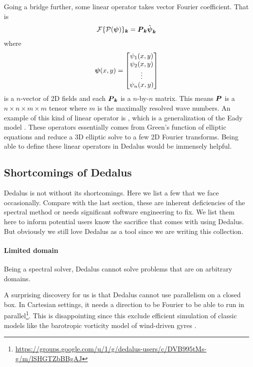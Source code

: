Going a bridge further, some linear operator takes vector Fourier coefficient. That is
\begin{align}
    \mathcal{F}\{\mathcal{P}(\boldsymbol{\psi})\}_{\boldsymbol{k}} = \boldsymbol{P}_{\boldsymbol{k}}\hat{\boldsymbol{\psi}}_{\boldsymbol{k}}
\end{align}
where 
\begin{align}
    \boldsymbol{\psi}(x,y) = \begin{bmatrix}
        \psi_1(x,y)\\
        \psi_2(x,y)\\
        \vdots\\
        \psi_n(x,y)
    \end{bmatrix}
\end{align}
is a $n$-vector of 2D fields and each $\boldsymbol{P}_{\boldsymbol{k}}$ is a $n$-by-$n$ matrix. This means $\boldsymbol{P}$ is a $n\times n\times m\times m$ tensor where $m$ is the maximally resolved wave numbers. An example of this kind of linear operator is \cite{CalliesEtAl_16}, which is a generalization of the Eady model \parencite{Eady_49, TullochSmith_09}. These operators essentially comes from Green's function of elliptic equations and reduce a 3D elliptic solve to a few 2D Fourier transforms. Being able to define these linear operators in Dedalus would be immensely helpful. 

\subsection{Shortcomings of Dedalus}
Dedalus is not without its shortcomings. Here we list a few that we face occasionally. Compare with the last section, these are inherent deficiencies of the spectral method or needs significant software engineering to fix. We list them here to inform potential users know the sacrifice that comes with using Dedalus. But obviously we still love Dedalus as a tool since we are writing this collection.

\paragraph{Limited domain}
Being a spectral solver, Dedalus cannot solve problems that are on arbitrary domains. 

A surprising discovery for us is that Dedalus cannot use parallelism on a closed box. In Cartesian settings, it needs a direction to be Fourier to be able to run in parallel\footnote{\url{https://groups.google.com/u/1/g/dedalus-users/c/DVB995tMs-g/m/lSHGTZbBBgAJ}}. This is disappointing since this exclude efficient simulation of classic models like the barotropic vorticity model of wind-driven gyres \parencite[\S 19.4]{Vallis_17}. 


